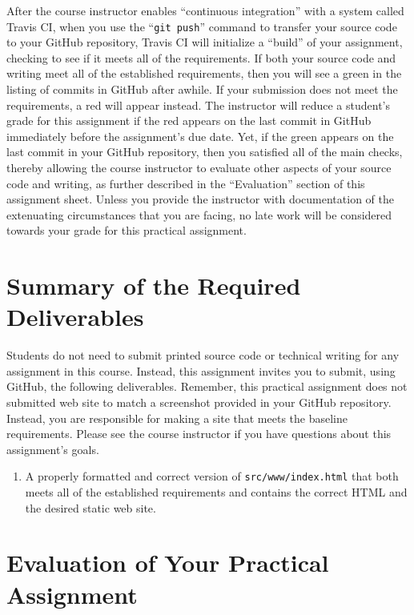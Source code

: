 \documentclass[11pt]{article}
\newcommand{\mainprogramsource}{\lstinline{src/www/index.html}}
\newcommand{\gitpush}{\command{git push}}
\newcommand{\command}[1]{``\lstinline{#1}''}
\newcommand{\step}[1]{``{#1}''}
\newcommand{\checkmark}{\ding{51}}
\newcommand{\naughtmark}{\ding{55}}
\begin{document}
After the course instructor enables \step{continuous integration} with a system
called Travis CI, when you use the \gitpush{} command to transfer your source
code to your GitHub repository, Travis CI will initialize a \step{build} of your
assignment, checking to see if it meets all of the requirements. If both your
source code and writing meet all of the established requirements, then you will
see a green \checkmark{} in the listing of commits in GitHub after awhile. If
your submission does not meet the requirements, a red \naughtmark{} will appear
instead. The instructor will reduce a student's grade for this assignment if the
red \naughtmark{} appears on the last commit in GitHub immediately before the
assignment's due date. Yet, if the green \checkmark{} appears on the last commit
in your GitHub repository, then you satisfied all of the main checks, thereby
allowing the course instructor to evaluate other aspects of your source code and
writing, as further described in the \step{Evaluation} section of this
assignment sheet. Unless you provide the instructor with documentation of the
extenuating circumstances that you are facing, no late work will be considered
towards your grade for this practical assignment.

\section*{Summary of the Required Deliverables}

\noindent Students do not need to submit printed source code or technical
writing for any assignment in this course. Instead, this assignment invites you
to submit, using GitHub, the following deliverables. Remember, this practical
assignment does not submitted web site to match a screenshot provided in your
GitHub repository. Instead, you are responsible for making a site that meets the
baseline requirements. Please see the course instructor if you have questions
about this assignment's goals.

\begin{enumerate}

  \setlength{\itemsep}{0in}

\item A properly formatted and correct version of \mainprogramsource{} that both
  meets all of the established requirements and contains the correct HTML and
  the desired static web site.

\end{enumerate}

\section*{Evaluation of Your Practical Assignment}
\end{document}
